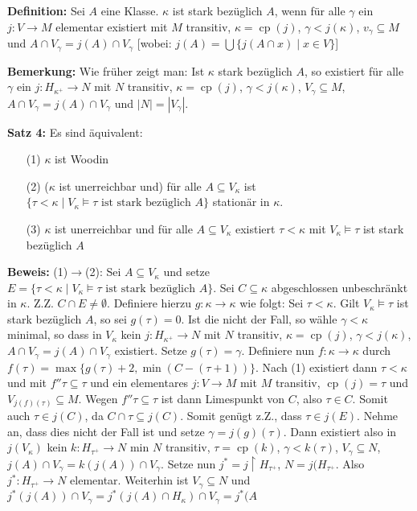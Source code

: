 \documentclass[a4paper,fontsize=11pt]{scrartcl}
\newcommand{\cp}{\operatorname{cp}}
\begin{document}
{\bf Definition:} Sei $A$ eine Klasse.
	$\kappa$ ist stark bezüglich $A$, wenn für alle $\gamma$ ein $j\colon V\to M$ elementar existiert mit $M$ transitiv, $\kappa=\cp(j)$, $\gamma<j(\kappa)$, $v_{\gamma}\subseteq M$ und $A\cap V_{\gamma}= j(A)\cap V_{\gamma}$
	[wobei: $j(A)=\bigcup \{j(A\cap x)\mid x\in V\}$]

{\bf Bemerkung:} Wie früher zeigt man: Ist $\kappa$ stark bezüglich $A$, so existiert für alle $\gamma$ ein $j\colon H_{\kappa^+}\to N$ mit $N$ transitiv, $\kappa=\cp(j)$, $\gamma<j(\kappa)$, $V_{\gamma}\subseteq M$, $A\cap V_\gamma= j(A)\cap V_\gamma$ und $|N|=|V_\gamma|$.

{\bf Satz 4:} Es sind äquivalent:
	\begin{itemize}
		\item[(1)] $\kappa$ ist Woodin
		\item[(2)] ($\kappa$ ist unerreichbar und) für alle $A\subseteq V_{\kappa}$ ist $\{\tau<\kappa\mid V_{\kappa}\models \tau \mbox{ ist stark bezüglich } A\}$ stationär in $\kappa$.
		\item[(3)] $\kappa$ ist unerreichbar und für alle $A\subseteq V_{\kappa}$ existiert $\tau<\kappa$ mit $V_{\kappa}\models \tau$ ist stark bezüglich $A$
	\end{itemize}

	{\bf Beweis:} (1)$\to$(2): Sei $A\subseteq V_\kappa$ und setze $E=\{\tau<\kappa\mid V_\kappa\models \tau \mbox{ ist stark bezüglich } A\}$.
		Sei $C\subseteq \kappa$ abgeschlossen unbeschränkt in $\kappa$.
		Z.Z. $C\cap E\neq\emptyset$.
		Definiere hierzu $g\colon\kappa\to\kappa$ wie folgt:
		Sei $\tau<\kappa$.
		Gilt $V_{\kappa}\models \tau$ ist stark bezüglich $A$, so sei $g(\tau)=0$.
		Ist die nicht der Fall, so wähle $\gamma<\kappa$ minimal, so dass in $V_{\kappa}$ kein $j\colon H_{\kappa^+}\to N$ mit $N$ transitiv, $\kappa=\cp(j)$,
		$\gamma<j(\kappa)$, $A\cap V_{\gamma}=j(A)\cap V_\gamma$ existiert.
		Setze $g(\tau)=\gamma$.
		Definiere nun $f\colon \kappa\to\kappa$ durch $f(\tau)=\max\{g(\tau)+2, \min(C-(\tau+1))\}$.
		Nach (1) existiert dann $\tau<\kappa$ und mit $f''\tau\subseteq\tau$ und ein elementares $j\colon V\to M$ mit $M$ transitiv, $\cp(j)=\tau$ und $V_{j(f)(\tau)}\subseteq M$.
		Wegen $f''\tau\subseteq\tau$ ist dann Limespunkt von $C$, also $\tau\in C$.
		Somit auch $\tau \in j(C)$, da $C\cap\tau \subseteq j(C)$.
		Somit genügt z.Z., dass $\tau\in j(E)$.
		Nehme an, dass dies nicht der Fall ist und setze $\gamma= j(g)(\tau)$.
		Dann existiert also in $j(V_\kappa)$ kein  $k\colon H_{\tau^+}\to N$ min $N$ transitiv, $\tau=\cp(k)$, $\gamma<k(\tau)$, $V_\gamma\subseteq N$, $j(A)\cap V_\gamma = k(j(A))\cap V_\gamma$.
		Setze nun $j^*=j\upharpoonright H_{\tau^+}$, $N=j(H_{\tau^+}$.
		Also $j^*\colon H_{\tau^+}\to N$ elementar.
		Weiterhin ist $V_{\gamma}\subseteq N$ und $j^*(j(A))\cap V_\gamma=j^*(j(A)\cap H_{\kappa})\cap V_{\gamma}=j^*(A$
		
		
\end{document}
